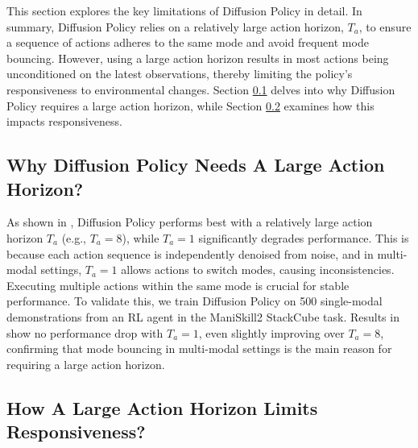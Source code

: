 This section explores the key limitations of Diffusion Policy in detail. In summary, Diffusion Policy relies on a relatively large action horizon, \( T_a \), to ensure a sequence of actions adheres to the same mode and avoid frequent mode bouncing. However, using a large action horizon results in most actions being unconditioned on the latest observations, thereby limiting the policy's responsiveness to environmental changes. Section \ref{sec:why_large_action_horizon} delves into why Diffusion Policy requires a large action horizon, while Section \ref{sec:how_limit_responsiveness} examines how this impacts responsiveness.

\subsection{Why Diffusion Policy Needs A Large Action Horizon?}
\label{sec:why_large_action_horizon}

As shown in \cite{chi2023diffusion}, Diffusion Policy performs best with a relatively large action horizon $T_a$ (e.g., $T_a = 8$), while $T_a = 1$ significantly degrades performance. This is because each action sequence is independently denoised from noise, and in multi-modal settings, $T_a = 1$ allows actions to switch modes, causing inconsistencies. Executing multiple actions within the same mode is crucial for stable performance. To validate this, we train Diffusion Policy on 500 single-modal demonstrations from an RL agent in the ManiSkill2 StackCube task. Results in  show no performance drop with $T_a = 1$, even slightly improving over $T_a = 8$, confirming that mode bouncing in multi-modal settings is the main reason for requiring a large action horizon.

\subsection{How A Large Action Horizon Limits Responsiveness?}
\label{sec:how_limit_responsiveness}

